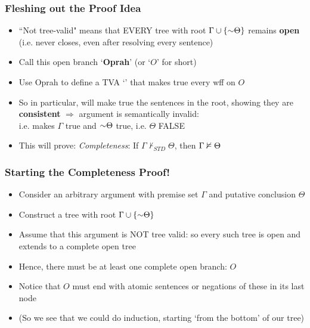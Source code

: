 \begin{frame}
\frametitle{Fleshing out the Proof Idea}

\begin{itemize}[<+->]

\item ``Not tree-valid" means that EVERY tree with root $\Gamma \cup \{ \enot \Theta \}$ remains \textbf{\textcolor{OGlyallpink}{open}} (i.e. never closes, even after resolving every sentence)

\item Call this open branch `\textbf{\textcolor{OGlyallpink}{Oprah}}' (or `$O$' for short)

\item Use Oprah to define a TVA `' that makes true every wff on $O$

\item So in particular,  will make true the sentences in the root, showing they are \textbf{\textcolor{OGlyallpink}{consistent}} $\Rightarrow$ argument is semantically invalid: \\ i.e.  makes $\Gamma$ true and $\enot \Theta$ true, i.e. $\Theta$ FALSE

\item This will prove: \emph{Completeness}: If $\Gamma \nvdash_{STD} \Theta$, then $\Gamma \nvDash \Theta$

\end{itemize}
\end{frame}

\begin{frame}
\frametitle{Starting the Completeness Proof!}

\begin{itemize}[<+->]

\item Consider an arbitrary argument with premise set $\Gamma$ and putative conclusion $\Theta$

\item Construct a tree with root $\Gamma \cup \{ \enot \Theta \}$ 

\item Assume that this argument is NOT tree valid: so every such tree is open and extends to a complete open tree

\item Hence, there must be at least one complete open branch: $O$

\item Notice that $O$ must end with atomic sentences or negations of these in its last node

\item (So we see that we could do induction, starting `from the bottom' of our tree) 

\end{itemize}
\end{frame}

